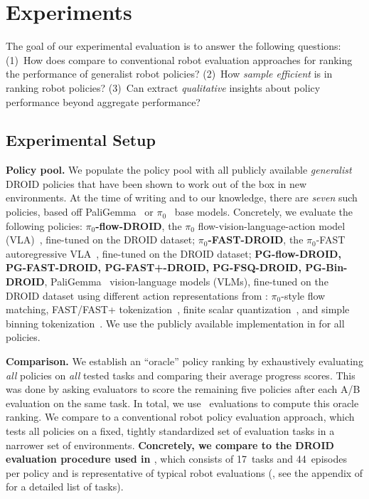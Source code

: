 \section{Experiments}
\label{sec:experiments}

The goal of our experimental evaluation is to answer the following questions: (1)~How does \Acronym{} compare to conventional robot evaluation approaches for ranking the performance of generalist robot policies? (2)~How \emph{sample efficient} is \Acronym{} in ranking robot policies? (3)~Can \Acronym{} extract \emph{qualitative} insights about policy performance beyond aggregate performance?

\subsection{Experimental Setup}



\textbf{Policy pool.} We populate the policy pool with all publicly available \emph{generalist} DROID policies that have been shown to work out of the box in new environments. At the time of writing and to our knowledge, there are \emph{seven} such policies, based off PaliGemma~\citep{beyer2024paligemma} or $\pi_0$~\citep{black2024pi_0} base models. %
Concretely, we evaluate the following policies: \textbf{$\pi_0$-flow-DROID}, the $\pi_0$ flow-vision-language-action model (VLA)~\citep{black2024pi_0}, fine-tuned on the DROID dataset; \textbf{$\pi_0$-FAST-DROID}, the $\pi_0$-FAST autoregressive VLA~\citep{pertsch2025fast}, fine-tuned on the DROID dataset; \textbf{PG-flow-DROID, PG-FAST-DROID, PG-FAST+-DROID, PG-FSQ-DROID, PG-Bin-DROID}, PaliGemma~\citep{beyer2024paligemma} vision-language models (VLMs), fine-tuned on the DROID dataset using different action representations from \citet{pertsch2025fast}: $\pi_0$-style flow matching, FAST/FAST+ tokenization~\citep{pertsch2025fast}, finite scalar quantization~\citep{fsq}, and simple binning tokenization~\citep{rt22023arxiv, kim2024openvla}. We use the publicly available implementation in \citep{pi2025openpi} for all policies.

\textbf{Comparison.} We establish an ``oracle'' policy ranking by exhaustively evaluating \emph{all} policies on \emph{all} tested tasks and comparing their average progress scores. This was done by asking evaluators to score the remaining five policies after each A/B evaluation on the same task. In total, we use \NEvals{}~evaluations to compute this oracle ranking. We compare \Acronym{} to a conventional robot policy evaluation approach, which tests all policies on a fixed, tightly standardized set of evaluation tasks in a narrower set of environments. \textbf{Concretely, we compare to the DROID evaluation procedure used in \citet{pertsch2025fast}}, which consists of 17~tasks and 44~episodes per policy and is representative of typical robot evaluations (\citep{kim2024openvla, Zawalski24-ecot}, see the appendix of \citet{pertsch2025fast} for a detailed list of tasks). %

